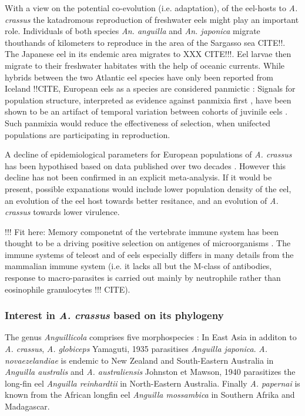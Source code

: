 With a view on the potential co-evolution (i.e. adaptation), of the
eel-hosts to \textit{A. crassus} the katadromous reproduction of
freshwater eels might play an important role. Individuals of both
species \textit{An. anguilla} and \textit{An. japonica} migrate
thouthands of kilometers to reproduce in the area of the Sargasso sea
CITE!!. The Japanese eel in its endemic area migrates to XXX
CITE!!!. Eel larvae then migrate to their freshwater habitates with
the help of oceanic currents. While hybrids between the two Atlantic
eel species have only been reported from Iceland !!CITE, European eels
as a species are considered panmictic \cite{pmid20735687}: Signals for
population structure, interpreted as evidence against panmixia first
\cite{pmid11234011}, have been shown to be an artifact of temporal
variation between cohorts of juvinile eels \cite{pmid19417764,
  pmid21299662, pmid16024374}. Such panmixia would reduce the
effectiveness of selection, when unifected populations are
participating in reproduction.

A decline of epidemiological parameters for European populations of
\textit{A. crassus} has been hypothised based on data published over
two decades \cite{lefebvre_anguillicolosis:_2004}. However this
decline has not been confirmed in an explicit meta-analysis. If it
would be present, possible expanations would include lower population
density of the eel, an evolution of the eel host towards better
resitance, and an evolution of \textit{A. crassus} towards lower
virulence.

!!! Fit here:
Memory componetnt of the vertebrate immune system has been thought to
be a driving positive selection on antigenes of microorganisms
\cite{conway_measuring_2002}. The immune systems of teleost and of
eels especially differs in many details from the mammalian immune
system (i.e. it lacks all but the M-class of antibodies, response to
macro-parasites is carried out mainly by neutrophile rather than
eosinophile granulocytes !!! CITE).


\subsubsection{Interest in \textit{A. crassus} based on its
    phylogeny}
\label{phyl-int}

The genus \textit{Anguillicola} comprises five morphospecies
\cite{taraschewski_revision_1988}: In East Asia in additon to
\textit{A. crassus}, \textit{A. globiceps} Yamaguti, 1935
\cite{yamaguti_globiceps} parasitises \textit{Anguilla
  japonica}. \textit{A. novaezelandiae} is endemic to New Zealand and
South-Eastern Australia in \textit{Anguilla australis} and
\textit{A. australiensis} Johnston et Mawson, 1940
\cite{johnston1940some} parasitizes the long-fin eel \textit{Anguilla
  reinhardtii} in North-Eastern Australia. Finally
\textit{A. papernai} is known from the African longfin eel
\textit{Anguilla mossambica} in Southern Afrika and Madagascar.

